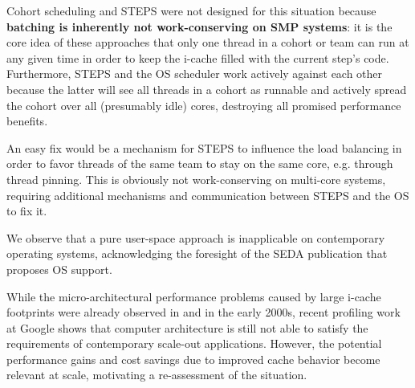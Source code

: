 \documentclass[12pt,a4paper]{book}
\begin{document}
Cohort scheduling and STEPS were not designed for this situation because
\textbf{batching is inherently not work-conserving on SMP systems}:
it is the core idea of these approaches that only one thread in a cohort or team can run at any given time in order to keep the i-cache filled with the current step's code.
Furthermore, STEPS and the OS scheduler work actively against each other because the latter will see all threads in a cohort as runnable and actively spread the cohort over all (presumably idle) cores,
destroying all promised performance benefits.

An easy fix would be a mechanism for STEPS to influence the load balancing in order to favor threads of the same team to stay on the same core, e.g. through thread pinning.
This is obviously not work-conserving on multi-core systems, requiring additional mechanisms and communication between STEPS and the OS to fix it.

We observe that a pure user-space approach is inapplicable on contemporary operating systems, acknowledging the foresight of the SEDA publication that proposes OS support.

While the micro-architectural performance problems caused by large i-cache footprints were already observed in \cite{cohort} and \cite{steps} in the early 2000s,
recent profiling work at Google shows that computer architecture is still not able to satisfy the requirements of contemporary scale-out applications.
However, the potential performance gains and cost savings due to improved cache behavior become relevant at scale, motivating a re-assessment of the situation.
\end{document}
